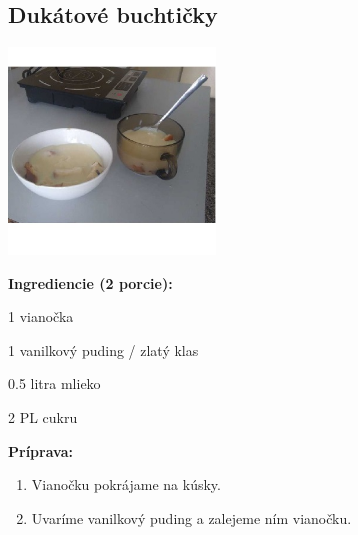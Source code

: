 \setcounter{step}{0}

\subsection{ Dukátové buchtičky }

\begin{ingredient}
  
      \includegraphics[height=5.5cm]{images/dukatky}
  
  \def\portions{  }
  \textbf{ {\normalsize Ingrediencie (2 porcie):} }

  \begin{main}
      \item 1 vianočka
      \item 1 vanilkový puding / zlatý klas
      \item 0.5 litra mlieko
      \item 2 PL cukru
  \end{main}
  
\end{ingredient}
\begin{recipe}
\textbf{ {\normalsize Príprava:} }
\begin{enumerate}

  \item{Vianočku pokrájame na kúsky.}
  \item{Uvaríme vanilkový puding a zalejeme ním vianočku.}

\end{enumerate}
\end{recipe}

\begin{notes}
  
\end{notes}	
\clearpage
